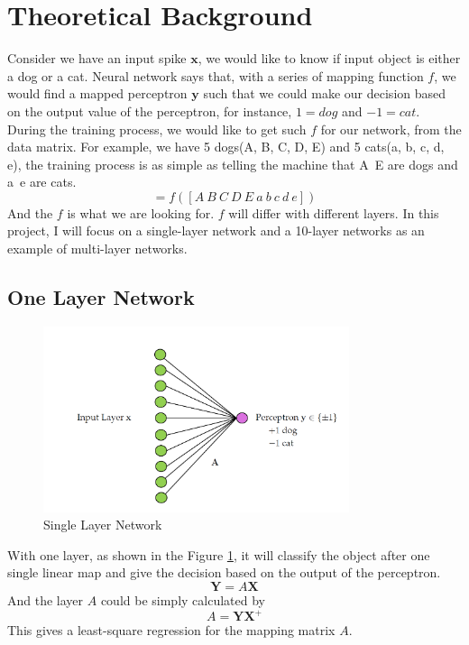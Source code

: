 \documentclass[preprint,12pt]{elsarticle}
\begin{document}
        \section{Theoretical Background}
        Consider we have an input spike $\mathbf{x}$, we would like to know if input object is either a dog or a cat.
        Neural network says that, with a series of mapping function $f$, we would find a mapped perceptron $\mathbf{y}$
        such that we could make our decision based on the output value of the perceptron, for instance, $ 1 = dog$ and 
        $-1 = cat$. During the training process, we would like to get such $f$ for our network, from the data matrix.
        For example, we have 5 dogs(A, B, C, D, E) and 5 cats(a, b, c, d, e), the training process is as simple as telling 
        the machine that A~E are dogs and a~e are cats.
        \begin{equation*}
            [1\ 1\ 1\ 1\ 1\ -1\ -1\ -1\ -1\ -1] = f([A\ B\ C\ D\ E\ a\ b\ c\ d\ e])
        \end{equation*}
        And the $f$ is what we are looking for. $f$ will differ with different layers. In this project, I will focus on 
        a single-layer network and a 10-layer networks as an example of multi-layer networks.  
    
        \subsection{One Layer Network}
        \begin{figure}[h]
            \center
            \includegraphics[width = 0.8\textwidth]{onelay.PNG}
            \caption{Single Layer Network}
            \label{fig:1}
        \end{figure}
        With one layer, as shown in the Figure \ref{fig:1}, it will classify the object after one single linear map and 
        give the decision based on the output of the perceptron.
        \begin{equation*}
            \mathbf{Y} = A \mathbf{X}
        \end{equation*}
        And the layer $A$ could be simply calculated by 
        \begin{equation*}
            A = \mathbf{Y} \mathbf{X}^{+}
        \end{equation*}
        This gives a least-square regression for the mapping matrix $A$.
    
\end{document}
